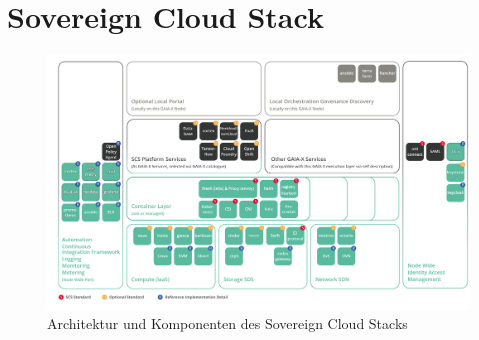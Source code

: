 \section{Sovereign Cloud Stack}
\label{sec:gaia-x:scs}

\begin{figure}[h]
  \centering
  \includegraphics[height=0.69\textwidth]{gfx/chapters/5_gaia-X/scs_architecture.png}
  \caption{Architektur und Komponenten des Sovereign Cloud Stacks}
  \label{fig:scs_architecture}
\end{figure}